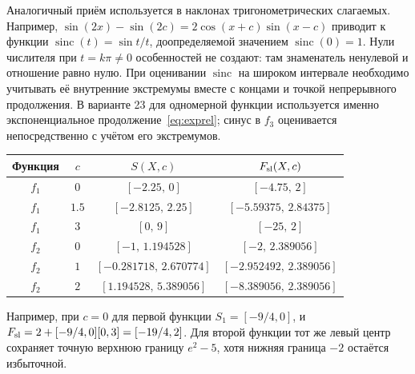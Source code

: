 \documentclass[12pt,a4paper]{article}
\newcommand{\sinc}{\operatorname{sinc}}
\begin{document}
Аналогичный приём используется в наклонах тригонометрических
слагаемых. Например,
$\sin(2x)-\sin(2c)=2\cos(x+c)\sin(x-c)$ приводит к функции
$\sinc(t)=\sin t/t$, доопределяемой значением $\sinc(0)=1$.
Нули числителя при $t=k\pi\ne0$ особенностей не создают:
там знаменатель ненулевой и отношение равно нулю.
При оценивании $\sinc$ на широком интервале необходимо учитывать
её внутренние экстремумы вместе с концами и точкой непрерывного
продолжения. В варианте 23 для одномерной функции используется
именно экспоненциальное продолжение~\eqref{eq:exprel};
синус в $f_3$ оценивается непосредственно с учётом его экстремумов.

\begin{center}
{\small
\begin{tabular}{cccc}
\toprule
Функция & $c$ & $S(X,c)$ & $F_{\rm sl}(X,c)$\\\midrule
$f_1$ & $0$ & $[-2.25,\,0]$ & $[-4.75,\,2]$\\
$f_1$ & $1.5$ & $[-2.8125,\,2.25]$ & $[-5.59375,\,2.84375]$\\
$f_1$ & $3$ & $[0,\,9]$ & $[-25,\,2]$\\
$f_2$ & $0$ & $[-1,\,1.194528]$ & $[-2,\,2.389056]$\\
$f_2$ & $1$ & $[-0.281718,\,2.670774]$ & $[-2.952492,\,2.389056]$\\
$f_2$ & $2$ & $[1.194528,\,5.389056]$ & $[-8.389056,\,2.389056]$\\
\bottomrule
\end{tabular}}
\end{center}

Например, при $c=0$ для первой функции
$S_1=[-9/4,0]$, и $F_{\rm sl}=2+[-9/4,0][0,3]=[-19/4,2]$.
Для второй функции тот же левый центр сохраняет точную верхнюю
границу $e^2-5$, хотя нижняя граница $-2$ остаётся избыточной.
\end{document}
